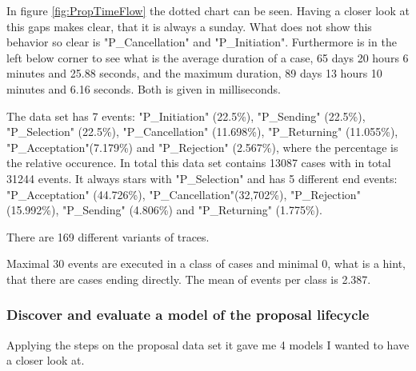 In figure \ref{fig:PropTimeFlow} the dotted chart can be seen. Having a closer look at this gaps makes clear, that it is always a sunday. What does not show this behavior so clear is "P\_Cancellation" and "P\_Initiation". Furthermore is in the left below corner to see what is the average duration of a case, 65 days 20 hours 6 minutes and 25.88 seconds, and the maximum duration, 89 days 13 hours 10 minutes and 6.16 seconds. Both is given in milliseconds.

The data set has 7 events: "P\_Initiation" (22.5\%), 
"P\_Sending" (22.5\%), "P\_Selection" (22.5\%), "P\_Cancellation" (11.698\%), "P\_Returning" (11.055\%), "P\_Acceptation"(7.179\%) and "P\_Rejection" (2.567\%), where the percentage is the relative occurence. In total this data set contains 13087 cases with in total 31244 events. It always stars with "P\_Selection" and has 5 different end events: "P\_Acceptation" (44.726\%), "P\_Cancellation"(32,702\%), "P\_Rejection" (15.992\%), "P\_Sending" (4.806\%) and "P\_Returning" (1.775\%).

There are 169 different variants of traces.

Maximal 30 events are executed in a class of cases and minimal 0, what is a hint, that there are cases ending directly. The mean of events per class is 2.387.


\subsubsection{Discover and evaluate a model of the proposal lifecycle}

Applying the steps on the proposal data set it gave me 4 models I wanted to have a closer look at.

